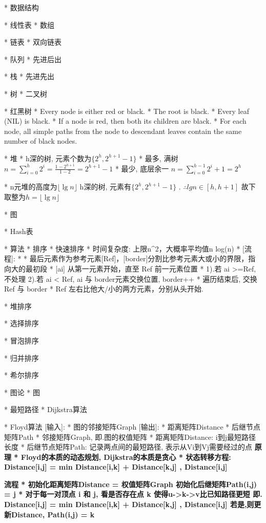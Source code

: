 
* 数据结构

	* 线性表
		* 数组

		* 链表
			* 双向链表

		* 队列
			* 先进后出

		* 栈
			* 先进先出

	* 树
		* 二叉树

		* 红黑树
			\Property
				* Every node is either red or black.
				* The root is black.
				* Every leaf (NIL) is black.
				* If a node is red, then both its children are black.
				* For each node, all simple paths from the node to descendant leaves contain the same number of black nodes.

		* 堆
			\Property
				* h深的树, 元素个数为$\{ 2^h, 2^{h+1} - 1 \}$ 
					\Proof
						* 最多, 满树
						$n = \sum_{i=0}^h 2^i = \frac{1 - 2^{h+1}}{1 - 2} = 2^{h+1} - 1$
						* 最少, 底层余一
						$n = \sum_{i=0}^{h-1} 2^i + 1 = 2^h$

				* n元堆的高度为$⌊\lg n⌋$
					\Proof
						h深的树, 元素有$\{ 2^h, 2^{h+1} - 1 \}$
						. $∴ lg n \in [h, h + 1]$
						故下取整为$ h = ⌊\lg n⌋$

	* 图

	* Hash表

* 算法
	* 排序
		* 快速排序
			\Property
				* 时间复杂度: 上限n^2，大概率平均值n log(n)
				*	[流程]: 
				*		* 最后元素作为参考元素[Ref]，[border]分割比参考元素大或小的界限，指向大的最初段
						* [ai] 从第一元素开始，直至 Ref 前一元素位置
						*	1).若 ai >=Ref, 不处理
							2).若 ai < Ref, 
								ai 与 border元素交换位置, border++
						* 遍历结束后, 交换Ref 与 border
						* Ref 左右比他大/小的两方元素，分别从头开始. 
			
		* 堆排序

		* 选择排序

		* 冒泡排序

		* 归并排序

		* 希尔排序

	* 图论
		* 图

		* 最短路径
			* Dijkstra算法

			* Floyd算法
				[输入]:	* 图的邻接矩阵Graph
				[输出]: * 距离矩阵Distance	* 后继节点矩阵Path
					* 邻接矩阵Graph, 即.图的权值矩阵
					* 距离矩阵Distance: i到j最短路径长度
					* 后继节点矩阵Path: 记录两点间的最短路径, 表示从Vi到Vj需要经过的点
				\bf{原理}
					* Floyd的本质的动态规划, Dijkstra的本质是贪心
					* 状态转移方程:
						Distance[i,j] = min{ Distance[i,k] + Distance[k,j] , Distance[i,j] }

				\bf{流程}
					* 初始化距离矩阵Distance = 权值矩阵Graph
						初始化后继矩阵Path(i,j) = j
					* 对于每一对顶点 i 和 j, 看是否存在点 k 使得u->k->v比已知路径更短
							即. Distance[i,j] = min{ Distance[i,k] + Distance[k,j] , Distance[i,j] }
						若是,则更新Distance, Path(i,j) = k
				
